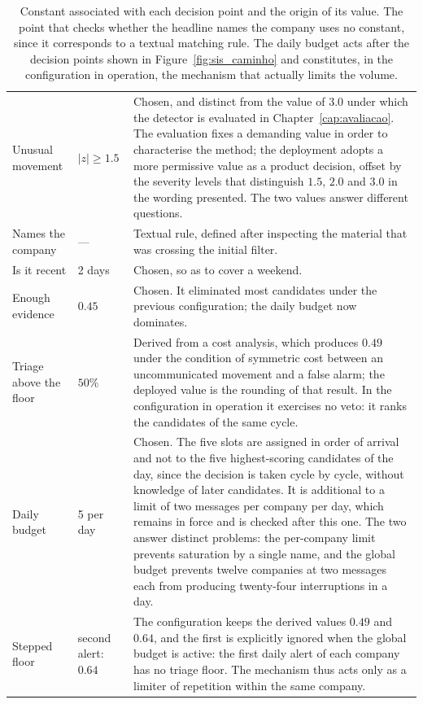 \begin{table}[!htbp]
\caption[Thresholds of the decision policy and their provenance]{Constant associated with each
decision point and the origin of its value. The point that checks whether the headline names the
company uses no constant, since it corresponds to a textual matching rule. The daily budget acts after the decision points shown in
Figure~\ref{fig:sis_caminho} and constitutes, in the configuration in operation, the mechanism that
actually limits the volume.}
\label{tab:sis_portas}
\centering
\small
\begin{tabular}{L{0.22\textwidth} L{0.16\textwidth} p{0.50\textwidth}}
\toprule
{} &  &  \\
\midrule
Unusual movement & $|z| \geq 1.5$ & Chosen, and distinct from the value of $3.0$ under which the
detector is evaluated in Chapter~\ref{cap:avaliacao}. The evaluation fixes a demanding value in
order to characterise the method; the deployment adopts a more permissive value as a product
decision, offset by the severity levels that distinguish $1.5$, $2.0$ and $3.0$ in the wording
presented. The two values answer different questions. \\
Names the company & --- & Textual rule, defined after inspecting the material that was crossing
the initial filter. \\
Is it recent & 2 days & Chosen, so as to cover a weekend. \\
Enough evidence & $0.45$ & Chosen. It eliminated most candidates under the previous configuration;
the daily budget now dominates. \\
Triage above the floor & $50\%$ & Derived from a cost analysis, which produces $0.49$ under the
condition of symmetric cost between an uncommunicated movement and a false alarm; the deployed
value is the rounding of that result. In the configuration in operation it exercises no veto: it
ranks the candidates of the same cycle. \\
Daily budget & 5 per day & Chosen. The five slots are assigned in order of arrival and not to the
five highest-scoring candidates of the day, since the decision is taken cycle by cycle, without
knowledge of later candidates. It is additional to a limit of two messages per company per day,
which remains in force and is checked after this one. The two answer distinct problems: the
per-company limit prevents saturation by a single name, and the global budget prevents twelve
companies at two messages each from producing twenty-four interruptions in a day. \\
\addlinespace
Stepped floor & second alert: $0.64$ & The configuration keeps the derived values $0.49$ and
$0.64$, and the first is explicitly ignored when the global budget is active: the first daily
alert of each company has no triage floor. The mechanism thus acts only as a limiter of
repetition within the same company. \\
\bottomrule
\end{tabular}
\end{table}

